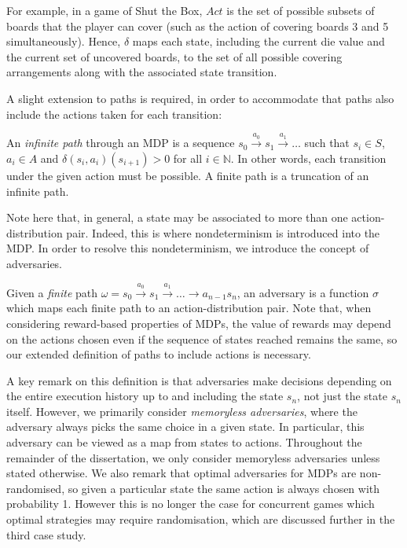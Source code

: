 For example, in a game of Shut the Box, $Act$ is the set of possible subsets of boards that the player can cover (such as the action of covering boards 3 and 5 simultaneously). Hence, $\delta$ maps each state, including the current die value and the current set of uncovered boards, to the set of all possible covering arrangements along with the associated state transition.

A slight extension to paths is required, in order to accommodate that paths also include the actions taken for each transition:

\begin{definition}
\label{cs1:mdp_paths}

An \emph{infinite path} through an MDP is a sequence $s_0 \xrightarrow{a_0} s_1 \xrightarrow{a_1} \dots$ such that $s_i \in S$, $a_i \in A$ and $\delta(s_i,a_i)(s_{i+1}) > 0$ for all $i \in \mathbb{N}$. In other words, each transition under the given action must be possible. A finite path is a truncation of an infinite path.


\end{definition}

Note here that, in general, a state may be associated to more than one action-distribution pair. Indeed, this is where nondeterminism is introduced into the MDP. In order to resolve this nondeterminism, we introduce the concept of adversaries.

\begin{definition}
\label{cs1:adversaries}

Given a \emph{finite} path $\omega = s_0 \xrightarrow{a_0} s_1 \xrightarrow{a_1} \dots \rightarrow{a_{n-1}} s_n$, an adversary is a function $\sigma$ which maps each finite path to an action-distribution pair. Note that, when considering reward-based properties of MDPs, the value of rewards may depend on the actions chosen even if the sequence of states reached remains the same, so our extended definition of paths to include actions is necessary.

\end{definition}

A key remark on this definition is that adversaries make decisions depending on the entire execution history up to and including the state $s_n$, not just the state $s_n$ itself. However, we primarily consider \emph{memoryless adversaries}, where the adversary always picks the same choice in a given state. In particular, this adversary can be viewed as a map from states to actions. Throughout the remainder of the dissertation, we only consider memoryless adversaries unless stated otherwise. We also remark that optimal adversaries for MDPs are non-randomised, so given a particular state the same action is always chosen with probability 1. However this is no longer the case for concurrent games which optimal strategies may require randomisation, which are discussed further in the third case study.

